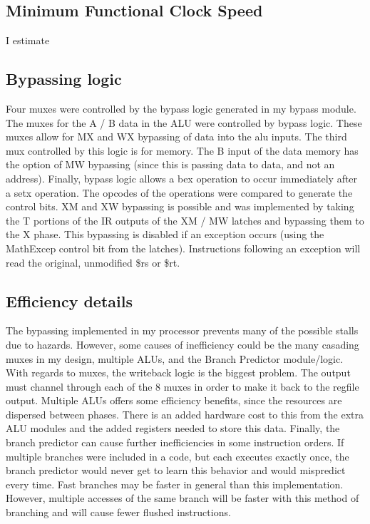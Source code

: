 \documentclass[letterpaper]{article} %
\begin{document}
\subsection{Minimum Functional Clock Speed}
I estimate 

\subsection{Bypassing logic}
Four muxes were controlled by the bypass logic generated in my bypass module. The muxes for the A / B data in the ALU were controlled by bypass logic. These muxes allow for MX and WX bypassing of data into the alu inputs. The third mux controlled by this logic is for memory. The B input of the data memory has the option of MW bypassing (since this is passing data to data, and not an address). Finally, bypass logic allows a bex operation to occur immediately after a setx operation. The opcodes of the operations were compared to generate the control bits. XM and XW bypassing is possible and was implemented by taking the T portions of the IR outputs of the XM / MW latches and bypassing them to the X phase. This bypassing is disabled if an exception occurs (using the MathExcep control bit from the latches). Instructions following an exception will read the original, unmodified \$rs or \$rt.

\subsection{Efficiency details}
The bypassing implemented in my processor prevents many of the possible stalls due to hazards. However, some causes of inefficiency could be the many casading muxes in my design, multiple ALUs, and the Branch Predictor module/logic. With regards to muxes, the writeback logic is the biggest problem. The output must channel through each of the 8 muxes in order to make it back to the regfile output. Multiple ALUs offers some efficiency benefits, since the resources are dispersed between phases. There is an added hardware cost to this from the extra ALU modules and the added registers needed to store this data. Finally, the branch predictor can cause further inefficiencies in some instruction orders. If multiple branches were included in a code, but each executes exactly once, the branch predictor would never get to learn this behavior and would mispredict every time. Fast branches may be faster in general than this implementation. However, multiple accesses of the same branch will be faster with this method of branching and will cause fewer flushed instructions. 
\end{document}
